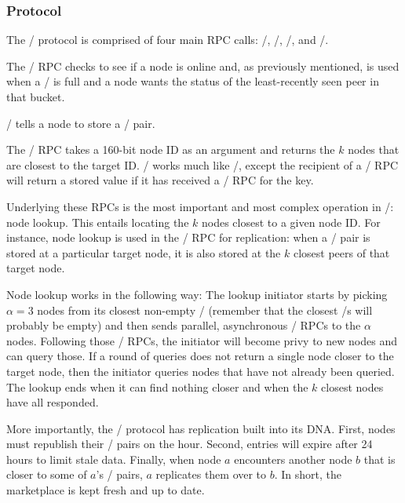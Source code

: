 \documentclass[11pt,twocolumn]{article}
\begin{document}
\subsubsection{Protocol}

The \Kademlia/ protocol is comprised of four main RPC calls: \ping/, \store/, \findNode/, and \findValue/.

The \ping/ RPC checks to see if a node is online and, as previously mentioned, is used when a \kbucket/ is full and a node wants the status of the least-recently seen peer in that bucket.

\store/ tells a node to store a \kv/ pair.

The \findNode/ RPC takes a 160-bit node ID as an argument and returns the $k$ nodes that are closest to the target ID.
\findValue/ works much like \findNode/, except the recipient of a \findValue/ RPC will return a stored value if it has received a \store/ RPC for the key.

Underlying these RPCs is the most important and most complex operation in \Kademlia/: node lookup.
This entails locating the $k$ nodes closest to a given node ID.
For instance, node lookup is used in the \store/ RPC for replication:
when a \kv/ pair is stored at a particular target node, it is also stored at the $k$ closest peers of that target node.

Node lookup works in the following way:
The lookup initiator starts by picking $\alpha = 3$ nodes from its closest non-empty \kbucket/ (remember that the closest \kbucket/s will probably be empty) and then sends parallel, asynchronous \findNode/ RPCs to the $\alpha$ nodes.
Following those \findNode/ RPCs, the initiator will become privy to new nodes and can query those.
If a round of queries does not return a single node closer to the target node, then the initiator queries nodes that have not already been queried.
The lookup ends when it can find nothing closer and when the $k$ closest nodes have all responded.

More importantly, the \Kademlia/ protocol has replication built into its DNA.
First, nodes must republish their \kv/ pairs on the hour.
Second, entries will expire after 24 hours to limit stale data.
Finally, when node $a$ encounters another node $b$ that is closer to some of $a$'s \kv/ pairs, $a$ replicates them over to $b$.
In short, the marketplace is kept fresh and up to date.
\end{document}

